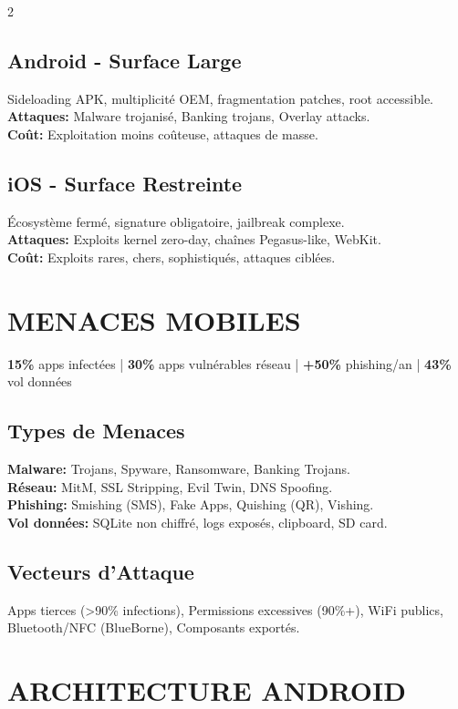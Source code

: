 \documentclass[9pt,a4paper]{extarticle}
\begin{document}
\begin{multicols}{2}
\subsection*{Android - Surface Large}
Sideloading APK, multiplicité OEM, fragmentation patches, root accessible.\\
\textbf{Attaques:} Malware trojanisé, Banking trojans, Overlay attacks.\\
\textbf{Coût:} Exploitation moins coûteuse, attaques de masse.

\subsection*{iOS - Surface Restreinte}
Écosystème fermé, signature obligatoire, jailbreak complexe.\\
\textbf{Attaques:} Exploits kernel zero-day, chaînes Pegasus-like, WebKit.\\
\textbf{Coût:} Exploits rares, chers, sophistiqués, attaques ciblées.

\section*{MENACES MOBILES}

\textbf{15\%} apps infectées | \textbf{30\%} apps vulnérables réseau | \textbf{+50\%} phishing/an | \textbf{43\%} vol données

\subsection*{Types de Menaces}
\textbf{Malware:} Trojans, Spyware, Ransomware, Banking Trojans.\\
\textbf{Réseau:} MitM, SSL Stripping, Evil Twin, DNS Spoofing.\\
\textbf{Phishing:} Smishing (SMS), Fake Apps, Quishing (QR), Vishing.\\
\textbf{Vol données:} SQLite non chiffré, logs exposés, clipboard, SD card.

\subsection*{Vecteurs d'Attaque}
Apps tierces (>90\% infections), Permissions excessives (90\%+), WiFi publics, Bluetooth/NFC (BlueBorne), Composants exportés.

\section*{ARCHITECTURE ANDROID}


\end{multicols}
\end{document}
